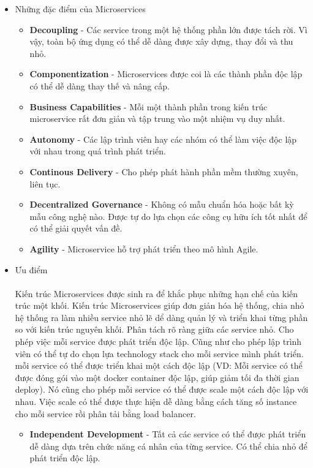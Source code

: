         \begin{itemize}
            \item Những đặc điểm của Microservices
            \begin{itemize}
                \item \textbf{Decoupling} - Các service trong một hệ thống phần lớn được tách rời. Vì vậy, toàn bộ ứng dụng có thể dễ dàng được xây dựng, thay đổi và thu nhỏ.
                \item \textbf{Componentization} - Microservices được coi là các thành phần độc lập có thể dễ dàng thay thế và nâng cấp.
                \item \textbf{Business Capabilities} - Mỗi một thành phần trong kiến trúc microservice rất đơn giản và tập trung vào một nhiệm vụ duy nhất.
                \item \textbf{Autonomy} - Các lập trình viên hay các nhóm có thể làm việc độc lập với nhau trong quá trình phát triển.
                \item \textbf{Continous Delivery} - Cho phép phát hành phần mềm thường xuyên, liên tục.
                \item \textbf{Decentralized Governance} - Không có mẫu chuẩn hóa hoặc bất kỳ mẫu công nghệ nào. Được tự do lựa chọn các công cụ hữu ích tốt nhất để có thể giải quyết vấn đề.
                \item \textbf{Agility} - Microservice hỗ trợ phát triển theo mô hình Agile.
            \end{itemize}
            \item Ưu điểm\\\\
            Kiến trúc Microservices được sinh ra để khắc phục những hạn chế của kiến trúc một khối. Kiến trúc Microservices giúp đơn giản hóa hệ thống, chia nhỏ hệ thống ra làm nhiều service nhỏ lẽ dể dàng quản lý và triển khai từng phần so với kiến trúc nguyên khối. Phân tách rõ ràng giữa các service nhỏ. Cho phép việc mỗi service được phát triển độc lập. Cũng như cho phép lập trình viên có thể tự do chọn lựa technology stack cho mỗi service mình phát triển. mỗi service có thể được triển khai một cách độc lập (VD: Mỗi service có thể được đóng gói vào một docker container độc lập, giúp giảm tối đa thời gian deploy). Nó cũng cho phép mỗi service có thể được scale một cách độc lập với nhau. Việc scale có thể được thực hiện dễ dàng bằng cách tăng số instance cho mỗi service rồi phân tải bằng load balancer.
            \begin{itemize}
                \item \textbf{Independent Development} - Tất cả các service có thể được phát triển dễ dàng dựa trên chức năng cá nhân của từng service. Có thể chia nhỏ để phát triển độc lập.

\end{itemize}
\end{itemize}
